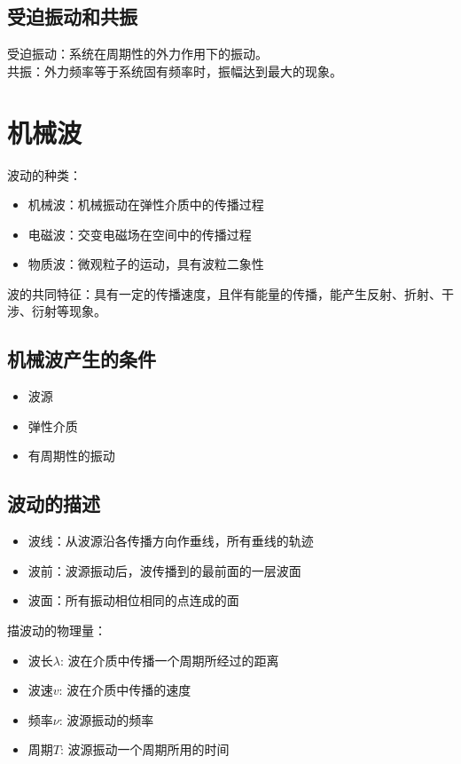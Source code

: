 \documentclass[12pt, a4paper, oneside]{ctexbook}
\begin{document}
\subsection{受迫振动和共振}
受迫振动：系统在周期性的外力作用下的振动。\\
共振：外力频率等于系统固有频率时，振幅达到最大的现象。

\section{机械波}
波动的种类：
\begin{itemize}
    \item 机械波：机械振动在弹性介质中的传播过程
    \item 电磁波：交变电磁场在空间中的传播过程
    \item 物质波：微观粒子的运动，具有波粒二象性
\end{itemize}
波的共同特征：具有一定的传播速度，且伴有能量的传播，能产生反射、折射、干涉、衍射等现象。
\subsection{机械波产生的条件}
\begin{itemize}
    \item 波源
    \item 弹性介质
    \item 有周期性的振动
\end{itemize}

\subsection{波动的描述}
\begin{itemize}
    \item 波线：从波源沿各传播方向作垂线，所有垂线的轨迹
    \item 波前：波源振动后，波传播到的最前面的一层波面
    \item 波面：所有振动相位相同的点连成的面
\end{itemize}
描波动的物理量：
\begin{itemize}
    \item 波长$\lambda$: 波在介质中传播一个周期所经过的距离
    \item 波速$v$: 波在介质中传播的速度
    \item 频率$\nu$: 波源振动的频率
    \item 周期$T$: 波源振动一个周期所用的时间
\end{itemize}
\end{document}
